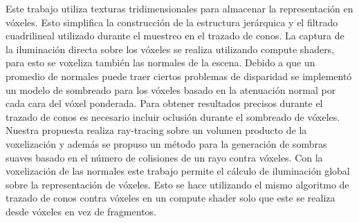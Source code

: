 
Este trabajo utiliza texturas tridimensionales para almacenar la representación en vóxeles. Esto simplifica la construcción de la estructura jerárquica y el filtrado cuadrilineal utilizado durante el muestreo en el trazado de conos. La captura de la iluminación directa sobre los vóxeles se realiza utilizando compute shaders, para esto se voxeliza también las normales de la escena. Debido a que un promedio de normales puede traer ciertos problemas de disparidad se implementó un modelo de sombreado para los vóxeles basado en la atenuación normal por cada cara del vóxel ponderada. Para obtener resultados precisos durante el trazado de conos es necesario incluir oclusión durante el sombreado de vóxeles. Nuestra propuesta realiza ray-tracing sobre un volumen producto de la voxelización y además se propuso un método para la generación de sombras suaves basado en el número de colisiones de un rayo contra vóxeles. Con la voxelización de las normales este trabajo permite el cálculo de iluminación global sobre la representación de vóxeles. Esto se hace utilizando el mismo algoritmo de trazado de conos contra vóxeles en un compute shader solo que este se realiza desde vóxeles en vez de fragmentos.

